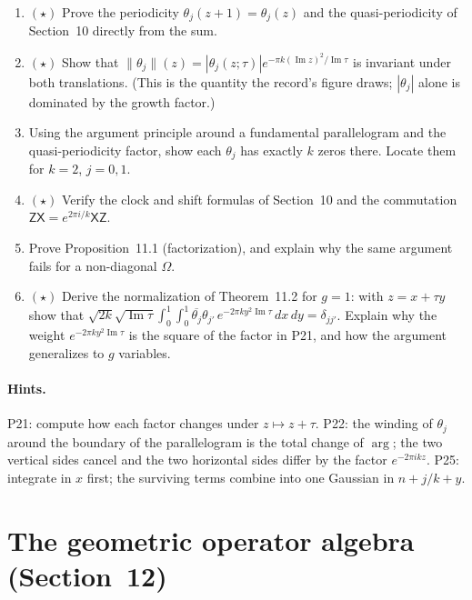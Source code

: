 \documentclass[11pt]{article}
\begin{document}
\begin{enumerate}[label=\textbf{P\arabic*.},leftmargin=*,start=20]
\item $(\star)$ Prove the periodicity $\theta_j(z+1) = \theta_j(z)$ and the
  quasi-periodicity of Section~10 directly from the sum.
\item $(\star)$ Show that
  $\|\theta_j\|(z) = |\theta_j(z;\tau)|e^{-\pi k(\operatorname{Im}z)^2/\operatorname{Im}\tau}$
  is invariant under both translations. (This is the quantity the record's
  figure draws; $|\theta_j|$ alone is dominated by the growth factor.)
\item Using the argument principle around a fundamental
  parallelogram and the quasi-periodicity factor, show each $\theta_j$ has
  exactly $k$ zeros there. Locate them for $k=2$, $j=0,1$.
\item $(\star)$ Verify the clock and shift formulas of Section~10
  and the commutation $\mathsf Z\mathsf X = e^{2\pi i/k}\mathsf X\mathsf Z$.
\item Prove Proposition~11.1 (factorization), and explain why the same argument
  fails for a non-diagonal $\Omega$.
\item $(\star)$ Derive the normalization of Theorem~11.2 for $g = 1$: with
  $z = x+\tau y$ show that
  $\sqrt{2k}\sqrt{\operatorname{Im}\tau}\int_0^1\!\!\int_0^1\overline{\theta_j}\theta_{j'}\,
  e^{-2\pi k y^2\operatorname{Im}\tau}\,dx\,dy = \delta_{jj'}$.
  Explain why the weight $e^{-2\pi k y^2\operatorname{Im}\tau}$ is the square of
  the factor in P21, and how the argument generalizes to $g$ variables.
\end{enumerate}

\paragraph{Hints.} P21: compute how each factor changes under $z\mapsto z+\tau$. P22: the winding of $\theta_j$ around the boundary of the parallelogram is
the total change of $\arg$; the two vertical sides cancel and the two
horizontal sides differ by the factor $e^{-2\pi i k z}$. P25: integrate in $x$ first; the surviving terms combine into one Gaussian in $n+j/k+y$.

\section{The geometric operator algebra (Section~12)}
\end{document}
